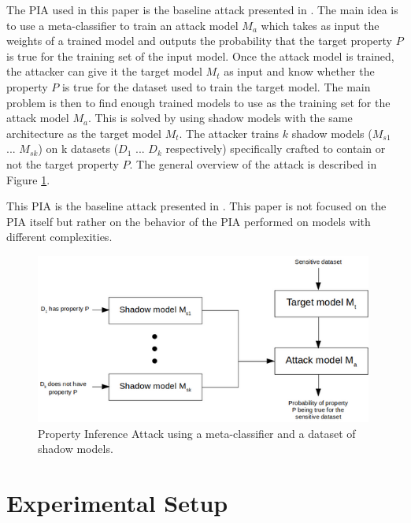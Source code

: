 \documentclass[11pt]{article}
\begin{document}
The PIA used in this paper is the baseline attack presented in \cite{Ganju2018}. The main idea is to use a meta-classifier to train an attack model $M_a$ which takes as input the weights of a trained model and outputs the probability that the target property $P$ is true for the training set of the input model. Once the attack model is trained, the attacker can give it the target model $M_t$ as input and know whether the property $P$ is true for the dataset used to train the target model. The main problem is then to find enough trained models to use as the training set for the attack model $M_a$. This is solved by using shadow models with the same architecture as the target model $M_t$. The attacker trains $k$ shadow models ($M_{s1}$ ... $M_{sk}$) on k datasets ($D_1$ ... $D_k$ respectively) specifically crafted to contain or not the target property $P$. The general overview of the attack is described in Figure \ref{pia_diagram}.

This PIA is the baseline attack presented in \cite{Ganju2018}. This paper is not focused on the PIA itself but rather on the behavior of the PIA performed on models with different complexities. \\ %

\begin{figure}[h]
    \centering
    \begin{minipage}{\textwidth}
        \centering
        \includegraphics[width=0.99\textwidth]{pia_diagram2.png} %
        \caption{Property Inference Attack using a meta-classifier and a dataset of shadow models.}
        \label{pia_diagram}
    \end{minipage}\hfill
\end{figure}

\section{Experimental Setup}
\end{document}
